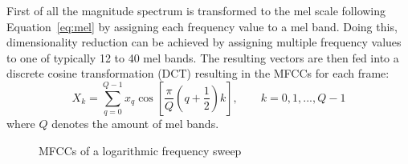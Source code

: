 \FloatBarrier
\noindent First of all the magnitude spectrum is transformed to the mel scale following Equation~\eqref{eq:mel} by assigning each frequency value to a mel band.
Doing this, dimensionality reduction can be achieved by assigning multiple frequency values to one of typically 12 to 40 mel bands. The resulting vectors are then fed into a discrete cosine transformation (DCT) resulting in the MFCCs for each frame:
\begin{equation} \label{eq:dct}
X_k = \sum_{q=0}^{Q-1}{x_q \cos\left[{\frac{\pi}{Q}(q + \frac{1}{2})k}\right]}, \qquad k=0,1,...,Q-1
\end{equation}
where $Q$ denotes the amount of mel bands.
\begin{figure}[htbp]
	\centering
	\caption{MFCCs of a logarithmic frequency sweep}	
	\label{fig:mfcc}
\end{figure}
